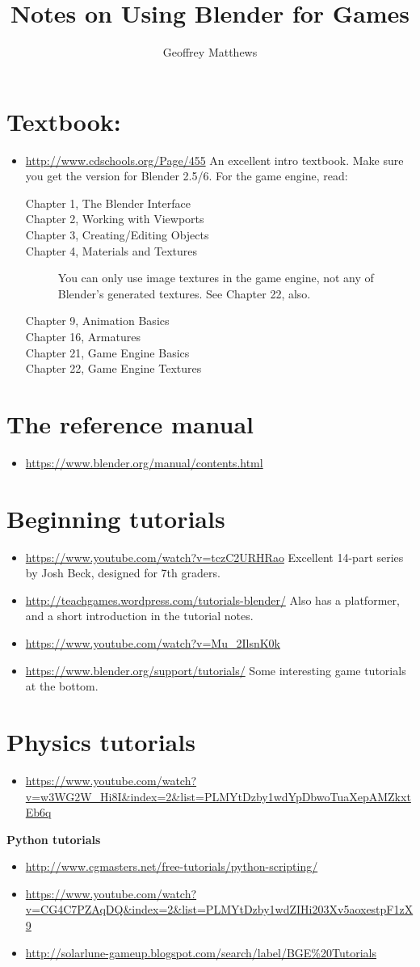 \documentclass[]{article}
\title{Notes on Using Blender for Games}
\author{Geoffrey Matthews}
\newcommand{\bi}{\begin{itemize}}
\newcommand{\ii}{\item}
\newcommand{\ei}{\end{itemize}}
\newcommand{\sect}[1]{\section{\bf #1}}
\begin{document}
\maketitle

\sect{Textbook:}
\bi
\ii\url{http://www.cdschools.org/Page/455}
An excellent intro textbook.  Make sure you get the version for 
Blender 2.5/6.  For the game engine, read:
\begin{description}
\item[Chapter 1, The Blender Interface]
\item[Chapter 2, Working with Viewports]
\item[Chapter 3, Creating/Editing Objects]
\item[Chapter 4, Materials and Textures] 
You can only use image textures in the game engine,
  not any of Blender's generated textures.  See Chapter 22, also.
\item[Chapter 9, Animation Basics]
\item[Chapter 16, Armatures]
\item[Chapter 21, Game Engine Basics]
\item[Chapter 22, Game Engine Textures]
\end{description}
\ei

\sect{The reference manual}
\bi
\ii \url{https://www.blender.org/manual/contents.html}
\ei

\sect{Beginning tutorials}
\bi
\ii \url{https://www.youtube.com/watch?v=tczC2URHRao}
Excellent 14-part series by Josh Beck, designed for 7th graders.

\ii \url{http://teachgames.wordpress.com/tutorials-blender/}
 Also has a platformer, and a short introduction in the 
tutorial notes.

\ii \url{https://www.youtube.com/watch?v=Mu_2IlsnK0k}

\ii\url{https://www.blender.org/support/tutorials/} Some interesting
game tutorials at the bottom.

  \ei

\sect{\bf Physics tutorials}
\bi
\ii \url{https://www.youtube.com/watch?v=w3WG2W_Hi8I&index=2&list=PLMYtDzby1wdYpDbwoTuaXepAMZkxtEb6q}
\ei

{\bf Python tutorials}
\bi
\ii\url{http://www.cgmasters.net/free-tutorials/python-scripting/}

\ii\url{https://www.youtube.com/watch?v=CG4C7PZAqDQ&index=2&list=PLMYtDzby1wdZIHi203Xv5aoxestpF1zX9}

\ii\url{http://solarlune-gameup.blogspot.com/search/label/BGE%20Tutorials}
\ei
\end{document}
